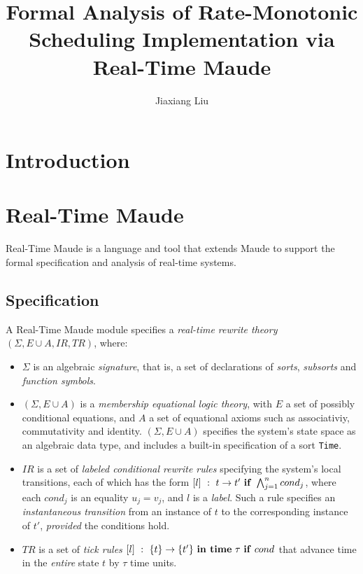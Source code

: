 \documentclass{llncs}
\begin{document}

\title{Formal Analysis of Rate-Monotonic Scheduling Implementation via Real-Time Maude}
\author{Jiaxiang Liu}
\maketitle
\thispagestyle{empty}

\section{Introduction}

\section{Real-Time Maude}

Real-Time Maude is a language and tool that extends Maude to support
the formal specification and analysis of real-time systems.

\subsection{Specification}

A Real-Time Maude module specifies a \emph{real-time rewrite theory}
$(\Sigma, E\cup A , IR, TR)$, where:

\begin{itemize}
\item $\Sigma$ is an algebraic \emph{signature}, that is, a set of
  declarations of \emph{sorts}, \emph{subsorts} and \emph{function
    symbols}.

\item $(\Sigma, E\cup A)$ is a \emph{membership equational logic
  theory}, with $E$ a set of possibly conditional equations, and $A$ a
  set of equational axioms such as associativiy, commutativity and
  identity.  $(\Sigma, E\cup A)$ specifies the system's state space as
  an algebraic data type, and includes a built-in specification of a
  sort \verb|Time|.

\item $IR$ is a set of \emph{labeled conditional rewrite rules}
  specifying the system's local transitions, each of which has the
  form $[l]~:~t\rightarrow t'\mbox{ \textbf{if}
  }\bigwedge^n_{j=1}cond_j$, where each $cond_j$ is an equality
  $u_j=v_j$, and $l$ is a \emph{label}. Such a rule specifies an
  \emph{instantaneous transition} from an instance of $t$ to the
  corresponding instance of $t'$, \emph{provided} the conditions hold.

\item $TR$ is a set of \emph{tick rules} $[l]~:~\{t\}\rightarrow\{t'\}
  \mbox{ \textbf{in time} }\tau\mbox{ \textbf{if} }cond$ that advance
  time in the \emph{entire} state $t$ by $\tau$ time units.
\end{itemize}
\end{document}
